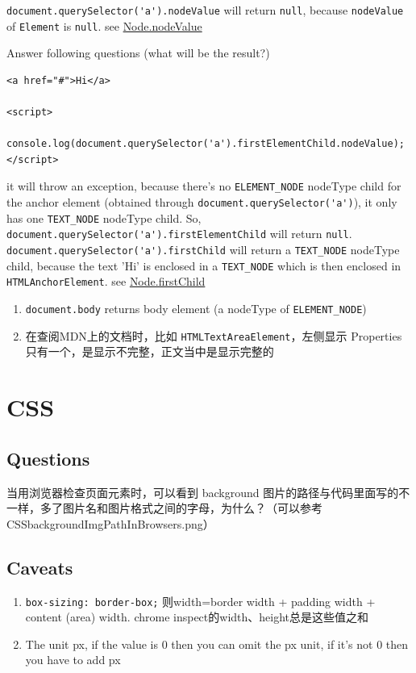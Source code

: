 \documentclass[a4paper, 12pt]{article}
\begin{document}
\verb|document.querySelector('a').nodeValue| will return \verb|null|, because \verb|nodeValue| of \verb|Element| is \verb|null|. see \href{https://developer.mozilla.org/en-US/docs/Web/API/Node/nodeValue}{Node.nodeValue}

Answer following questions (what will be the result?)
\begin{verbatim}
<a href="#">Hi</a>

<script>
  console.log(document.querySelector('a').firstElementChild.nodeValue);
</script>
\end{verbatim}

it will throw an exception, because there's no \verb|ELEMENT_NODE| nodeType child for the anchor element (obtained through \verb|document.querySelector('a')|), it only has one \verb|TEXT_NODE| nodeType child. So, \verb|document.querySelector('a').firstElementChild| will return \verb|null|. \verb|document.querySelector('a').firstChild| will return a \verb|TEXT_NODE| nodeType child, because the text 'Hi' is enclosed in a \verb|TEXT_NODE| which is then enclosed in \verb|HTMLAnchorElement|. see \href{https://developer.mozilla.org/en-US/docs/Web/API/Node/firstChild}{Node.firstChild}

\begin{enumerate}
\item \verb|document.body| returns body element (a nodeType of \verb|ELEMENT_NODE|)

\item 在查阅MDN上的文档时，比如 \verb|HTMLTextAreaElement|，左侧显示 Properties 只有一个，是显示不完整，正文当中是显示完整的

\end{enumerate}


\section{CSS}

\subsection{Questions}
当用浏览器检查页面元素时，可以看到 background 图片的路径与代码里面写的不一样，多了图片名和图片格式之间的字母，为什么？（可以参考 CSSbackgroundImgPathInBrowsers.png）

\subsection{Caveats}
\begin{enumerate}

\item {\color{red}\verb|box-sizing: border-box;|} 则width=border width + padding width + content (area) width. chrome inspect的width、height总是这些值之和

\item The unit px, if the value is 0 then you can omit the px unit, if it's not 0 then you have to add px

\end{enumerate}
\end{document}
